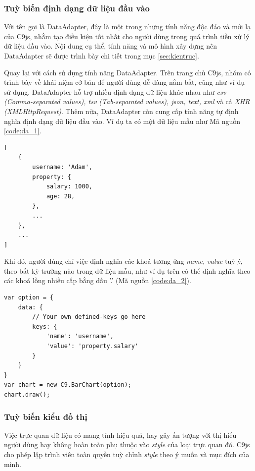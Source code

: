 \documentclass[12pt,a4paper]{article}
\begin{document}
\subsubsection{Tuỳ biến định dạng dữ liệu đầu vào}
Với tên gọi là DataAdapter, đây là một trong những tính năng độc đáo và mới lạ của C9js, nhằm tạo điều kiện tốt nhất cho người dùng trong quá trình tiền xử lý dữ liệu đầu vào. Nội dung cụ thể, tính năng và mô hình xây dựng nên DataAdapter sẽ được trình bày chi tiết trong mục \ref{sec:kientruc}.

Quay lại với cách sử dụng tính năng DataAdapter. Trên trang chủ C9js, nhóm có trình bày về khái niệm cở bản để người dùng dễ dàng nắm bắt, cũng như ví dụ sử dụng. DataAdapter hỗ trợ nhiều định dạng dữ liệu khác nhau như \textit{csv (Comma-separated values), tsv (Tab-separated values), json, text, xml} và cả \textit{XHR (XMLHttpRequest)}\cite{xhr}\cite{csv}\cite{tsv}. Thêm nữa, DataAdapter còn cung cấp tính năng tự định nghĩa định dạng dữ liệu đầu vào. Ví dụ ta có một dữ liệu mẫu như Mã nguồn \ref{code:da_1}.

\begin{lstlisting}[caption=Một dữ liệu mẫu với các thuộc tính lồng nhiều cấp, label={code:da_1}]
[
	{
		username: 'Adam',
		property: {
			salary: 1000,
			age: 28,
		},
		...
	},
	...
]
\end{lstlisting}

Khi đó, người dùng chỉ việc định nghĩa các khoá tương ứng \textit{name, value} tuỳ ý, theo bất kỳ trường nào trong dữ liệu mẫu, như ví dụ trên có thể định nghĩa theo các khoá lồng nhiều cấp bằng dấu \textsf{'.'} (Mã nguồn \ref{code:da_2}).

\begin{lstlisting}[caption=Định nghĩa định dạng dữ liệu đầu vào với C9js, label={code:da_2}]
var option = {
    data: {
        // Your own defined-keys go here
        keys: {
            'name': 'username',
            'value': 'property.salary'
        }
    }
}
var chart = new C9.BarChart(option);
chart.draw();
\end{lstlisting}

\subsubsection{Tuỳ biến kiểu đồ thị}
Việc trực quan dữ liệu có mang tính hiệu quả, hay gây ấn tượng với thị hiếu người dùng hay không hoàn toàn phụ thuộc vào \textit{style} của loại trực quan đó. C9js cho phép lập trình viên toàn quyền tuỳ chỉnh \textit{style} theo ý muốn và mục đích của mình.
\end{document}
